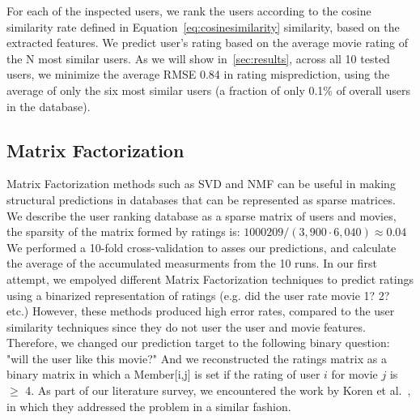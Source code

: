 For each of the inspected users, we rank the users according to the cosine similarity rate defined in Equation~\ref{eq:cosinesimilarity} similarity, based on the extracted features.
We predict user's rating based on the average movie rating of the N most similar users.
As we will show in~\ref{sec:results}, across all 10 tested users, we minimize the average RMSE 0.84 in rating misprediction, using the average of only the six most similar users (a fraction of only 0.1\% of overall users in the database).


\subsection{Matrix Factorization}

Matrix Factorization methods such as SVD and NMF can be useful in making structural predictions in databases that can be represented as sparse matrices.
We describe the user ranking database as a sparse matrix of users and movies, the sparsity of the matrix formed by ratings is: $1000209/(3,900 \cdot 6,040)\approx0.04$
We performed a 10-fold cross-validation to asses our predictions, and calculate the average of the accumulated measurments from the 10 runs. 
In our first attempt, we empolyed different Matrix Factorization techniques to predict ratings using a binarized representation of ratings (e.g. did the user rate movie 1? 2? etc.)
However, these methods produced high error rates, compared to the user similarity techniques since they do not user the user and movie features.
Therefore, we changed our prediction target to the following binary question: "will the user like this movie?"
And we reconstructed the ratings matrix as a binary matrix in which a Member[i,j] is set if the rating of user $i$ for movie $j$ is $\geq$ 4.
As part of our literature survey, we encountered the work by Koren et al.~\cite{koren2009matrix}, in which they addressed the problem in a similar fashion.

